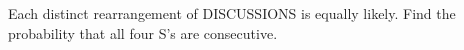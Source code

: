 Each distinct rearrangement of DISCUSSIONS is equally likely. Find the probability that all four S's are consecutive.
